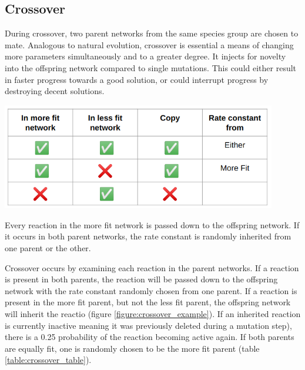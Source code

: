 \documentclass[12pt]{report}
\begin{document}
\subsection{Crossover}
\label{section: crossover}
During crossover, two parent networks from the same species group are chosen to mate. Analogous to natural evolution, crossover is essential a means of changing more parameters simultaneously and to a greater degree. It injects for novelty into the offspring network compared to single mutations. This could either result in faster progress towards a good solution, or could interrupt progress by destroying decent solutions.

\begin{table}
	\centering
    \includegraphics[width=12cm]{images/crossover_table.png}
    \caption[Crossover procedure]{Every reaction in the more fit network is passed down to the offspring network. If it occurs in both parent networks, the rate constant is randomly inherited from one parent or the other.}
    \label{table:crossover_table}
\end{table}

Crossover occurs by examining each reaction in the parent networks. If a reaction is present in both parents, the reaction will be passed down to the offspring network with the rate constant randomly chosen from one parent. If a reaction is present in the more fit parent, but not the less fit parent, the offspring network will inherit the reactio (figure \ref{figure:crossover_example}). If an inherited reaction is currently inactive meaning it was previously deleted during a mutation step), there is a 0.25 probability of the reaction becoming active again. If both parents are equally fit, one is randomly chosen to be the more fit parent (table \ref{table:crossover_table}). 
\end{document}
